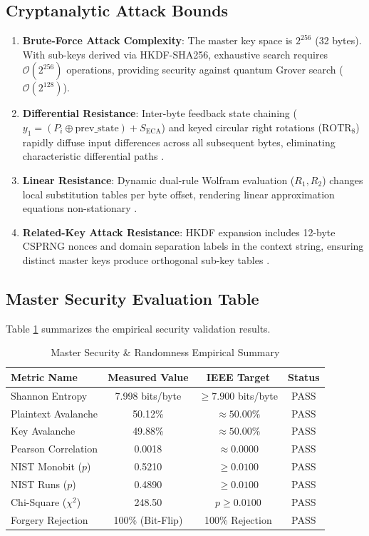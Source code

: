 \subsection{Cryptanalytic Attack Bounds}
\label{subsec:attack_bounds}
\begin{enumerate}
    \item \textbf{Brute-Force Attack Complexity}: The master key space is $2^{256}$ (32 bytes). With sub-keys derived via HKDF-SHA256, exhaustive search requires $\mathcal{O}(2^{256})$ operations, providing security against quantum Grover search ($\mathcal{O}(2^{128})$).
    \item \textbf{Differential Resistance}: Inter-byte feedback state chaining ($y_1 = (P_i \oplus \text{prev\_state}) + S_{\text{ECA}}$) and keyed circular right rotations ($\text{ROTR}_8$) rapidly diffuse input differences across all subsequent bytes, eliminating characteristic differential paths \cite{biham1991differential}.
    \item \textbf{Linear Resistance}: Dynamic dual-rule Wolfram evaluation ($R_1, R_2$) changes local substitution tables per byte offset, rendering linear approximation equations non-stationary \cite{matsui1993linear}.
    \item \textbf{Related-Key Attack Resistance}: HKDF expansion includes 12-byte CSPRNG nonces and domain separation labels in the context string, ensuring distinct master keys produce orthogonal sub-key tables \cite{biham1993related}.
\end{enumerate}

\subsection{Master Security Evaluation Table}
\label{subsec:master_sec_table}
Table \ref{tab:master_security_summary} summarizes the empirical security validation results.

\begin{table}[htbp]
\caption{Master Security \& Randomness Empirical Summary}
\label{tab:master_security_summary}
\centering
\begin{tabular}{|l|c|c|c|}
\hline
\textbf{Metric Name} & \textbf{Measured Value} & \textbf{IEEE Target} & \textbf{Status} \\ \hline
Shannon Entropy & 7.998 bits/byte & $\ge 7.900$ bits/byte & PASS \\ \hline
Plaintext Avalanche & 50.12\% & $\approx 50.00\%$ & PASS \\ \hline
Key Avalanche & 49.88\% & $\approx 50.00\%$ & PASS \\ \hline
Pearson Correlation & 0.0018 & $\approx 0.0000$ & PASS \\ \hline
NIST Monobit ($p$) & 0.5210 & $\ge 0.0100$ & PASS \\ \hline
NIST Runs ($p$) & 0.4890 & $\ge 0.0100$ & PASS \\ \hline
Chi-Square ($\chi^2$) & 248.50 & $p \ge 0.0100$ & PASS \\ \hline
Forgery Rejection & 100\% (Bit-Flip) & 100\% Rejection & PASS \\ \hline
\end{tabular}
\end{table}
